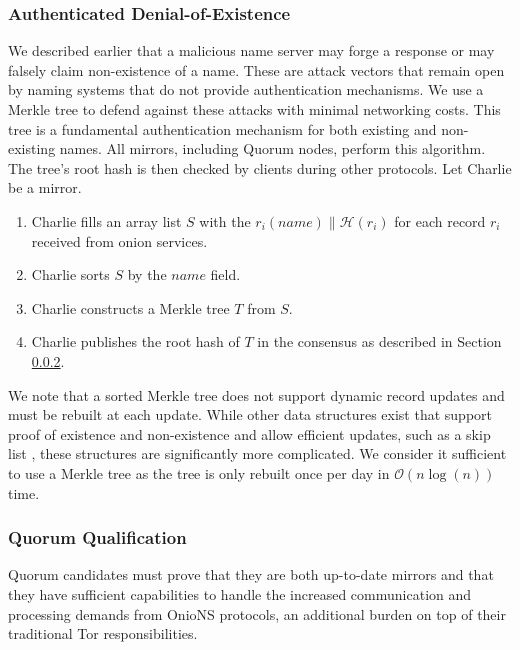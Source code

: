 \documentclass[USenglish,oneside,twocolumn]{article}
\newcommand*\concat{\mathbin{\|}}
\begin{document}
\subsubsection{Authenticated Denial-of-Existence}
\label{sec:authDenial}

We described earlier that a malicious name server may forge a response or may falsely claim non-existence of a name. These are attack vectors that remain open by naming systems that do not provide authentication mechanisms. We use a Merkle tree \cite{merkle1988digital} to defend against these attacks with minimal networking costs. This tree is a fundamental authentication mechanism for both existing and non-existing names. All mirrors, including Quorum nodes, perform this algorithm. The tree's root hash is then checked by clients during other protocols. Let Charlie be a mirror.

\begin{enumerate}
	\item Charlie fills an array list $ S $ with the $ r_{i}(\mathit{name}) \concat \mathcal{H}(r_{i}) $ for each record $ r_{i} $ received from onion services.
	\item Charlie sorts $ S $ by the $ \mathit{name} $ field.
	\item Charlie constructs a Merkle tree $ T $ from $ S $.
	\item Charlie publishes the root hash of $ T $ in the consensus as described in Section \ref{sec:qQualification}.
\end{enumerate}

We note that a sorted Merkle tree does not support dynamic record updates and must be rebuilt at each update. While other data structures exist that support proof of existence and non-existence and allow efficient updates, such as a skip list \cite{goodrich2001implementation}, these structures are significantly more complicated. We consider it sufficient to use a Merkle tree as the tree is only rebuilt once per day in $ \mathcal{O}(n \log(n)) $ time.

\subsubsection{Quorum Qualification}
\label{sec:qQualification}

Quorum candidates must prove that they are both up-to-date mirrors and that they have sufficient capabilities to handle the increased communication and processing demands from OnioNS protocols, an additional burden on top of their traditional Tor responsibilities.
\end{document}
